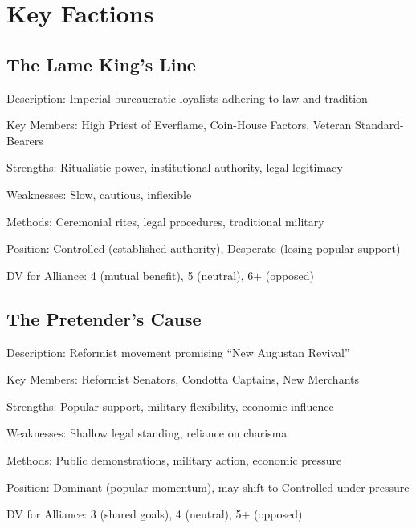 \documentclass[11pt]{article}
\newenvironment{faction}[1]{\begin{description}[leftmargin=*,style=standard]\item[\textbf{#1}]}{\end{description}}
\begin{document}
\section{Key Factions}

\subsection{The Lame King's Line}
\begin{faction}{The Lame King's Line}
\item[Description:] Imperial-bureaucratic loyalists adhering to law and tradition
\item[Key Members:] High Priest of Everflame, Coin-House Factors, Veteran Standard-Bearers
\item[Strengths:] Ritualistic power, institutional authority, legal legitimacy
\item[Weaknesses:] Slow, cautious, inflexible
\item[Methods:] Ceremonial rites, legal procedures, traditional military
\item[Position:] Controlled (established authority), Desperate (losing popular support)
\item[DV for Alliance:] 4 (mutual benefit), 5 (neutral), 6+ (opposed)
\end{faction}

\subsection{The Pretender's Cause}
\begin{faction}{The Pretender's Cause}
\item[Description:] Reformist movement promising ``New Augustan Revival''
\item[Key Members:] Reformist Senators, Condotta Captains, New Merchants
\item[Strengths:] Popular support, military flexibility, economic influence
\item[Weaknesses:] Shallow legal standing, reliance on charisma
\item[Methods:] Public demonstrations, military action, economic pressure
\item[Position:] Dominant (popular momentum), may shift to Controlled under pressure
\item[DV for Alliance:] 3 (shared goals), 4 (neutral), 5+ (opposed)
\end{faction}
\end{document}
